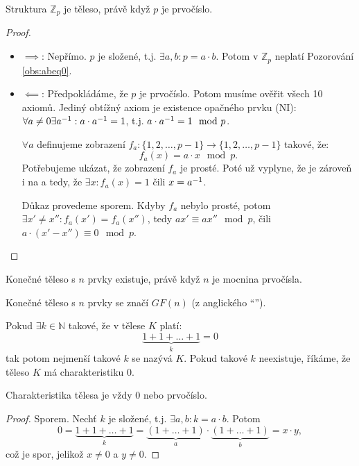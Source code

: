 \begin{proposition}
    \label{proposition:zp}
    Struktura $\mathbb{Z}_p$ je těleso, právě když $p$ je prvočíslo.
\end{proposition}

\begin{proof}
    \leavevmode
    \begin{itemize}
        \item $\implies$: Nepřímo. $p$ je složené, t.j. $\exists a,b: p = a 
            \cdot b$. Potom v $\mathbb{Z}_p$ neplatí Pozorování 
            \ref{obs:abeq0}.
        \item $\impliedby$: Předpokládáme, že $p$ je prvočíslo. Potom musíme
            ověřit všech 10 axiomů. Jediný obtížný axiom je existence opačného
            prvku (NI): $\forall a \neq 0 \exists a^{-1}: 
            a \cdot a^{-1} = 1$, t.j. $a \cdot a^{-1} = 1 \mod{p}$.

            $\forall a$ definujeme zobrazení $f_a: \{1, 2, \dots, p-1\} 
            \rightarrow \{1, 2, \dots, p-1\}$ takové, že: $$f_a(x) = 
            a \cdot x \mod{p}.$$ 
            Potřebujeme ukázat, že zobrazení $f_a$ je prosté. Poté už vyplyne,
            že je zároveň i na a tedy, že $\exists x: f_a(x) = 1$ čili 
            $x = a^{-1}$.

            Důkaz provedeme sporem. Kdyby $f_a$ nebylo prosté, potom 
            $\exists x' \neq x'': f_a(x') = f_a(x'')$, tedy 
            $ax' \equiv ax'' \mod{p}$, čili $a \cdot (x' - x'') \equiv 0 
            \mod{p}$.
    \end{itemize}
\end{proof}

\begin{theorem}
    Konečné těleso s $n$ prvky existuje, právě když $n$ je mocnina prvočísla.
\end{theorem}

\begin{remark}
    Konečné těleso s $n$ prvky se značí $GF(n)$ (z anglického 
    ``'').
\end{remark}

\begin{definition}
    Pokud $\exists k \in \mathbb{N}$ takové, že v tělese $K$ platí:
    $$ \underbrace{1+1+\dots+1}_{k} = 0$$
    tak potom nejmenší takové $k$ se nazývá 
     $K$. Pokud takové $k$ neexistuje, 
    říkáme, že těleso $K$ má charakteristiku $0$.
\end{definition}

\begin{theorem}
    Charakteristika tělesa je vždy $0$ nebo prvočíslo.
\end{theorem}

\begin{proof}
    Sporem. Nechť $k$ je složené, t.j. $\exists a, b: k = a \cdot b$.
    Potom $$ 0 = \underbrace{1 + 1 + \dots + 1}_{k} = 
    \underbrace{(1 + \dots + 1)}_{a} \cdot \underbrace{(1 + \dots + 1)}_{b} =
    x \cdot y,$$
    což je spor, jelikož $x \neq 0$ a $y \neq 0$.
\end{proof}
